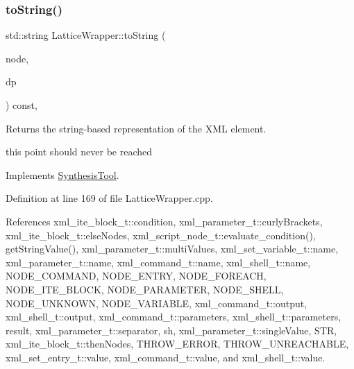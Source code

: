 \subsubsection{\texorpdfstring{to\+String()}{toString()}}
{\footnotesize\ttfamily std\+::string Lattice\+Wrapper\+::to\+String (\begin{DoxyParamCaption}\item[{const \hyperlink{xml__script__command_8hpp_a1fe3d50ade66bc35e41be9b68bbbcd02}{xml\+\_\+script\+\_\+node\+\_\+t\+Ref}}]{node,  }\item[{const \hyperlink{DesignParameters_8hpp_ae36bb1c4c9150d0eeecfe1f96f42d157}{Design\+Parameters\+Ref}}]{dp }\end{DoxyParamCaption}) const\hspace{0.3cm}{\ttfamily [override]}, {\ttfamily [virtual]}}



Returns the string-\/based representation of the X\+ML element. 

this point should never be reached 

Implements \hyperlink{classSynthesisTool_a98c5ba46f950300e1a5ca7cfcb409852}{Synthesis\+Tool}.



Definition at line 169 of file Lattice\+Wrapper.\+cpp.



References xml\+\_\+ite\+\_\+block\+\_\+t\+::condition, xml\+\_\+parameter\+\_\+t\+::curly\+Brackets, xml\+\_\+ite\+\_\+block\+\_\+t\+::else\+Nodes, xml\+\_\+script\+\_\+node\+\_\+t\+::evaluate\+\_\+condition(), get\+String\+Value(), xml\+\_\+parameter\+\_\+t\+::multi\+Values, xml\+\_\+set\+\_\+variable\+\_\+t\+::name, xml\+\_\+parameter\+\_\+t\+::name, xml\+\_\+command\+\_\+t\+::name, xml\+\_\+shell\+\_\+t\+::name, N\+O\+D\+E\+\_\+\+C\+O\+M\+M\+A\+ND, N\+O\+D\+E\+\_\+\+E\+N\+T\+RY, N\+O\+D\+E\+\_\+\+F\+O\+R\+E\+A\+CH, N\+O\+D\+E\+\_\+\+I\+T\+E\+\_\+\+B\+L\+O\+CK, N\+O\+D\+E\+\_\+\+P\+A\+R\+A\+M\+E\+T\+ER, N\+O\+D\+E\+\_\+\+S\+H\+E\+LL, N\+O\+D\+E\+\_\+\+U\+N\+K\+N\+O\+WN, N\+O\+D\+E\+\_\+\+V\+A\+R\+I\+A\+B\+LE, xml\+\_\+command\+\_\+t\+::output, xml\+\_\+shell\+\_\+t\+::output, xml\+\_\+command\+\_\+t\+::parameters, xml\+\_\+shell\+\_\+t\+::parameters, result, xml\+\_\+parameter\+\_\+t\+::separator, sh, xml\+\_\+parameter\+\_\+t\+::single\+Value, S\+TR, xml\+\_\+ite\+\_\+block\+\_\+t\+::then\+Nodes, T\+H\+R\+O\+W\+\_\+\+E\+R\+R\+OR, T\+H\+R\+O\+W\+\_\+\+U\+N\+R\+E\+A\+C\+H\+A\+B\+LE, xml\+\_\+set\+\_\+entry\+\_\+t\+::value, xml\+\_\+command\+\_\+t\+::value, and xml\+\_\+shell\+\_\+t\+::value.



